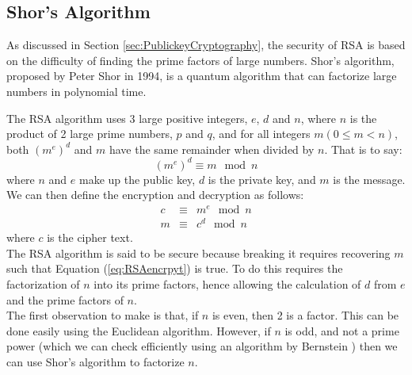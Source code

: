 \documentclass[reqno]{amsart}
\numberwithin{equation}{section}
\numberwithin{figure}{section}
\begin{document}
\subsection{Shor's Algorithm} \label{sec:ShorsAlgorithm}
\begin{justify}
    As discussed in Section \ref{sec:PublickeyCryptography}, the security of RSA is based on the difficulty of finding the prime factors of large numbers. Shor's algorithm, proposed by Peter Shor in 1994, is a quantum algorithm that can factorize large numbers in polynomial time. \cite{Shor1994}

The RSA algorithm uses 3 large positive integers, $e$, $d$ and $n$, where $n$ is the product of 2 large prime numbers, $p$ and $q$, and for all integers $m(0 \leq m < n)$, both $(m^{e})^{d}$ and $m$ have the same remainder when divided by $n$. That is to say:
    \begin{equation}
        (m^{e})^{d} \equiv m \mod n
    \end{equation}
where $n$ and $e$ make up the public key, $d$ is the private key, and $m$ is the message. We can then define the encryption and decryption as follows: 
    \begin{eqnarray}
        c &\equiv& m^{e} \mod n \label{eq:RSAencrpyt} \\
        m &\equiv& c^{d} \mod n
    \end{eqnarray}
where $c$ is the cipher text. \\

The RSA algorithm is said to be secure because breaking it requires recovering $m$ such that Equation (\ref{eq:RSAencrpyt}) is true. To do this requires the factorization of $n$ into its prime factors, hence allowing the calculation of $d$ from $e$ and the prime factors of $n$. \\

The first observation to make is that, if $n$ is even, then 2 is a factor. This can be done easily using the Euclidean algorithm. \cite{Shallit1994} However, if $n$ is odd, and not a prime power (which we can check efficiently using an algorithm by Bernstein \cite{Bernstein1998}) then we can use Shor's algorithm to factorize $n$. \\


\end{justify}
\end{document}
